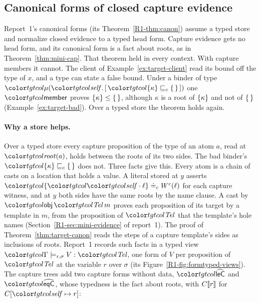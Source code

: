 \subsection{Canonical forms of closed capture evidence}\label{sec:target-canon}

Report~1's canonical forms (its Theorem~\ref{R1-thm:canon}) assume a typed store and normalize closed evidence to a typed head form. Capture evidence gets no head form, and its canonical form is a fact about roots, as in Theorem~\ref{thm:mini-cap}. That theorem held in every context. With capture members it cannot. The client of Example~\ref{ex:target-client} read its bound off the type of $x$, and a type can state a false bound. Under a binder of type $\obj{[\,\plec{\cset{\kappa}}{\cempty}\,]}$ one $\ev{member}$ proves $\{\kappa\} \le \{\,\}$, although $\kappa$ is a root of $\{\kappa\}$ and not of $\{\,\}$ (Example~\ref{ex:target-bad}). Over a typed store the theorem holds again.

\paragraph{Why a store helps.}
Over a typed store every capture proposition of the type of an atom $a$, read at $\rt{a}$, holds between the roots of its two sides. The bad binder's $\plec{\cset{\kappa}}{\cempty}$ does not. Three facts give this. Every atom is a chain of casts on a location that holds a value. A literal stored at $y$ asserts $\peqc{\cset{\sel{\self}{\ell}}}{W^{c}(\ell)}$ for each capture witness, and at $y$ both sides have the same roots by the name clause. A cast by $\ev{obj}\,\tel\,m$ proves each proposition of its target by a template in $m$, from the proposition of $\tel$ that the template's hole names (Section~\ref{R1-sec:mini-evidence} of report~1). The proof of Theorem~\ref{thm:target-canon} reads the steps of a capture template's sides as inclusions of roots. Report~1 records such facts in a typed view $\viewj{\Gamma}{r}{\sigma}{V}{\tel}$, one form of $V$ per proposition of $\tel$ at the variable $r$ over $\sigma$ (its Figure~\ref{R1-fig:formtyped-views}). The capture trees add two capture forms without data, $\form{leC}$ and $\form{eqC}$, whose typedness is the fact about roots, with $C\llbracket r\rrbracket$ for $C[\self \mapsto r]$:

